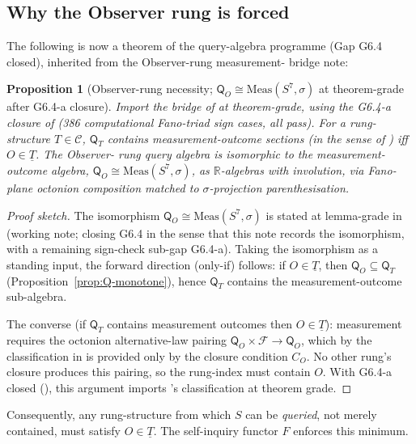 \documentclass[11pt, a4paper]{amsart}
\newtheorem{proposition}[theorem]{Proposition}
\theoremstyle{definition}
\newcommand{\R}{\mathbb{R}}
\newcommand{\catC}{\mathcal{C}}
\newcommand{\Fcal}{\mathcal{F}}
\newcommand{\Qalg}{\mathsf{Q}}
\begin{document}
\subsection{Why the Observer rung is forced}
\label{subsec:O-forced}

The following is now a theorem of the query-algebra programme
(Gap G6.4 closed), inherited from the Observer-rung measurement-
bridge note:

\begin{proposition}[Observer-rung necessity; $\Qalg_O \cong
  \mathrm{Meas}(S^7, \sigma)$ at theorem-grade after G6.4-a
  closure]
\label{thm:O-necessary}
Import the bridge of \cite{CascadeQOBridge} at theorem-grade,
using the G6.4-a closure of \cite{CascadeG64aClosure} (386
computational Fano-triad sign cases, all pass). For a
rung-structure $T \in \catC$, $\Qalg_T$ contains
measurement-outcome sections (in the sense of
\cite{PaperXXXIII}) iff $O \in \underline{T}$. The Observer-
rung query algebra is isomorphic to the measurement-outcome
algebra, $\Qalg_O \cong \mathrm{Meas}(S^7, \sigma)$, as
$\R$-algebras with involution, via Fano-plane octonion
composition matched to $\sigma$-projection parenthesisation.
\end{proposition}

\begin{proof}[Proof sketch]
The isomorphism $\Qalg_O \cong \mathrm{Meas}(S^7, \sigma)$ is
stated at lemma-grade in \cite{CascadeQOBridge} (working note;
closing G6.4 in the sense that this note records the
isomorphism, with a remaining sign-check sub-gap G6.4-a).
Taking the isomorphism as a standing input, the forward
direction (only-if) follows: if $O \in \underline{T}$, then
$\Qalg_O \subseteq \Qalg_T$
(Proposition~\ref{prop:Q-monotone}), hence $\Qalg_T$ contains
the measurement-outcome sub-algebra.

The converse (if $\Qalg_T$ contains measurement outcomes then
$O \in \underline{T}$): measurement requires the octonion
alternative-law pairing $\Qalg_O \times \Fcal \to \Qalg_O$,
which by the classification in \cite{CascadeQOBridge} is
provided only by the closure condition $C_O$. No other rung's
closure produces this pairing, so the rung-index must contain
$O$. With G6.4-a closed (\cite{CascadeG64aClosure}), this
argument imports \cite{CascadeQOBridge}'s classification at
theorem grade.
\end{proof}

Consequently, any rung-structure from which $S$ can be
\emph{queried}, not merely contained, must satisfy $O \in
\underline{T}$. The self-inquiry functor $F$ enforces this
minimum.
\end{document}
